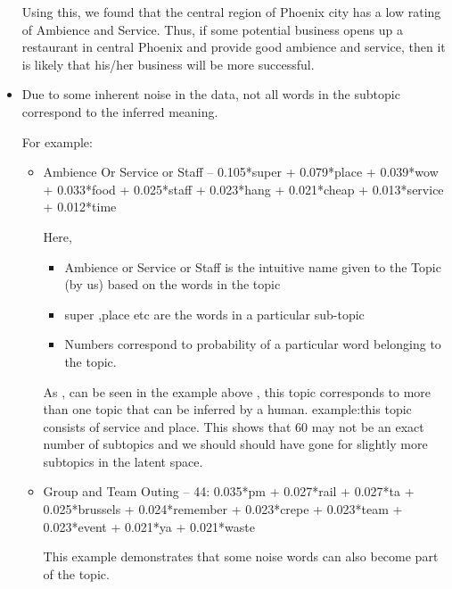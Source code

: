 \documentclass[12pt]{article} %
\begin{document}
\begin{itemize}
Using this, we found that the central region of Phoenix city has a low rating of Ambience and Service. Thus, if some potential business opens up a restaurant in central Phoenix and provide good ambience and service, then it is likely that his/her business will be more successful.
 
\item Due to some inherent noise in the data, not all words in the subtopic correspond to the inferred meaning.

For example:
	\begin{itemize}
	\item Ambience Or Service or Staff -- 0.105*super + 0.079*place + 0.039*wow + 0.033*food + 0.025*staff + 0.023*hang + 0.021*cheap + 0.013*service + 0.012*time
	
	Here,
		\begin{itemize}
		\item Ambience or Service or Staff is the intuitive name given  to the Topic (by us) based on the words in the topic
		\item super ,place etc are the words in a particular sub-topic 
		\item Numbers correspond to probability of a particular word belonging to the topic.
		\end{itemize}
		
	As , can be seen in the example above , this topic corresponds to more than one topic that can be inferred by a human. example:this topic consists of service and place. This shows that 60 may not be an exact number of subtopics and we should should have gone for slightly more subtopics in the latent space.\\ 
	
	\item Group and Team Outing -- 44: 0.035*pm + 0.027*rail + 0.027*ta + 0.025*brussels + 0.024*remember + 0.023*crepe + 0.023*team + 0.023*event + 0.021*ya + 0.021*waste
	
	This example demonstrates that some noise words can also become part of the topic.
	\end{itemize}


\end{itemize}
\end{document}
